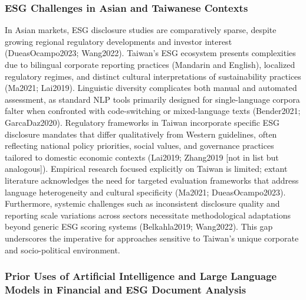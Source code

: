 \documentclass[
  12pt,
]{article}
\begin{document}
\subsubsection{ESG Challenges in Asian and Taiwanese
Contexts}\label{esg-challenges-in-asian-and-taiwanese-contexts}

In Asian markets, ESG disclosure studies are comparatively sparse,
despite growing regional regulatory developments and investor interest
(DueasOcampo2023; Wang2022). Taiwan's ESG ecosystem presents
complexities due to bilingual corporate reporting practices (Mandarin
and English), localized regulatory regimes, and distinct cultural
interpretations of sustainability practices (Ma2021; Lai2019).
Linguistic diversity complicates both manual and automated assessment,
as standard NLP tools primarily designed for single-language corpora
falter when confronted with code-switching or mixed-language texts
(Bender2021; GarcaDaz2020). Regulatory frameworks in Taiwan incorporate
specific ESG disclosure mandates that differ qualitatively from Western
guidelines, often reflecting national policy priorities, social values,
and governance practices tailored to domestic economic contexts
(Lai2019; Zhang2019 {[}not in list but analogous{]}). Empirical research
focused explicitly on Taiwan is limited; extant literature acknowledges
the need for targeted evaluation frameworks that address language
heterogeneity and cultural specificity (Ma2021; DueasOcampo2023).
Furthermore, systemic challenges such as inconsistent disclosure quality
and reporting scale variations across sectors necessitate methodological
adaptations beyond generic ESG scoring systems (Belkahla2019; Wang2022).
This gap underscores the imperative for approaches sensitive to Taiwan's
unique corporate and socio-political environment.

\subsubsection{Prior Uses of Artificial Intelligence and Large Language
Models in Financial and ESG Document
Analysis}\label{prior-uses-of-artificial-intelligence-and-large-language-models-in-financial-and-esg-document-analysis}
\end{document}
